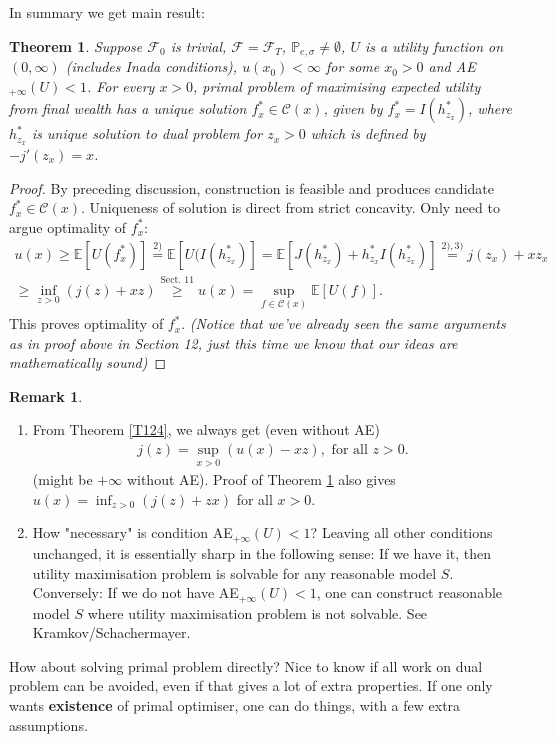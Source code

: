 \documentclass[12pt,a4paper, twoside]{article}
\newtheorem{thm}{Theorem}[section]
\theoremstyle{definition}
\newtheorem{rem}{Remark}[section]
\newcommand{\EE}{\mathbb{E}} %
\newcommand{\PP}{\mathbb{P}} %
\begin{document}
In summary we get main result:
\begin{thm} \label{T131} Suppose $\mathcal{F}_0$ is trivial, $\mathcal{F}= \mathcal{F}_T$, $\PP_{e, \sigma} \neq \emptyset$, $U$ is a utility function on $(0, \infty)$ (includes Inada conditions), $u(x_0) < \infty$ for some $x_0 >0$ and AE$_{+ \infty}(U) <1$. For every $x>0$, primal problem of maximising expected utility from final wealth has a unique solution $f_x^* \in \mathcal{C}(x)$, given by $f_x^*=I(h_{z_x}^*)$, where $h_{z_x}^*$ is unique solution to dual problem for $z_x>0$ which is defined by $-j'(z_x)=x$. 
\end{thm}
\begin{proof}
By preceding  discussion, construction is feasible and produces candidate $f_x^* \in \mathcal{C}(x)$. Uniqueness of solution is direct from strict concavity. Only need to argue optimality of $f_x^*$: 
\begin{align*}
u(x) \geq \EE[U(f_x^*)] \overset{2)}= \EE[U(I(h_{z_x}^*)] = \EE[J(h_{z_x}^*) + h_{z_x}^*I(h_{z_x}^*)] \overset{2),3)}= j(z_x) + xz_x \\ \geq \inf_{z >0} (j(z) + xz) \overset{\text{Sect. 11}}\geq u(x) = \sup_{f \in \mathcal{C}(x)} \EE[U(f)].
\end{align*}
This proves optimality of $f_x^*$. \textit{(Notice that we've already seen the same arguments as in proof above in Section 12, just this time we know that our ideas are mathematically sound)}
\end{proof}
\begin{rem} \
\begin{enumerate}
\item From Theorem \ref{T124}, we always get (even without AE) 
\begin{align*}
j(z)= \sup_{x >0} (u(x)-xz), \text{ for all } z>0.
\end{align*}
(might be $+ \infty$ without AE). Proof of Theorem \ref{T131} also gives $u(x) = \inf_{z >0} (j(z) + zx)$ for all $x>0$. 
\item How "necessary" is condition AE$_{+ \infty}(U) <1$? Leaving all other conditions unchanged, it is essentially sharp in the following sense: If we have it, then utility maximisation problem is solvable for any reasonable model $S$. Conversely: If we do not have AE$_{+ \infty}(U)<1$, one can construct reasonable model $S$ where utility maximisation problem is not solvable. See Kramkov/Schachermayer.
\end{enumerate}
\end{rem}
How about solving primal problem directly? Nice to know if all work on dual problem can be avoided, even if that gives a lot of extra properties. If one only wants \textbf{existence} of primal optimiser, one can do things, with a few extra assumptions.
\end{document}
